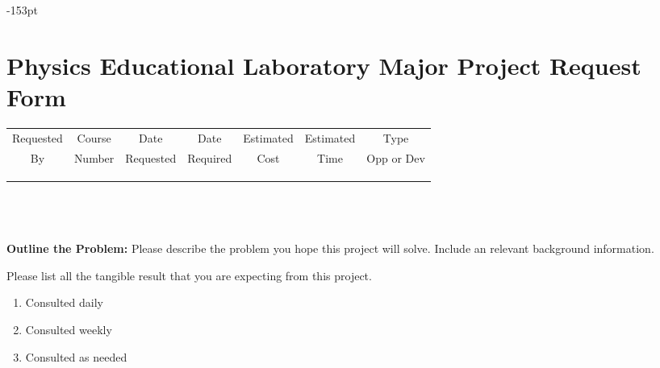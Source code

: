 




\begin{adjustwidth}{}{-153pt}

\section[\Huge,align=center]{\bf Physics Educational Laboratory Major Project Request Form}
\vspace{0.5cm}
\begin{tabular}{|c|c|c|c|c|c|c|}
\hline 
Requested & Course & Date & Date & Estimated & Estimated & Type \\ 
By & Number & Requested & Required & Cost & Time & Opp or Dev \\ 
\hline 
&&&&&&\\
&&&&&&\\
&&&&&&\\
\hline
\end{tabular} 
\vspace{1cm}
\\
\\
\\
{\bf Outline the Problem:}
Please describe the problem you hope this project will solve. Include an relevant background information.
\vspace{4cm}

 Please list all the tangible result that you are expecting from this project.
\vspace{6cm}


\begin{enumerate}
\item Consulted daily
\item Consulted weekly
\item Consulted as needed
\end{enumerate}
 

\subsection{}


\end{adjustwidth}



